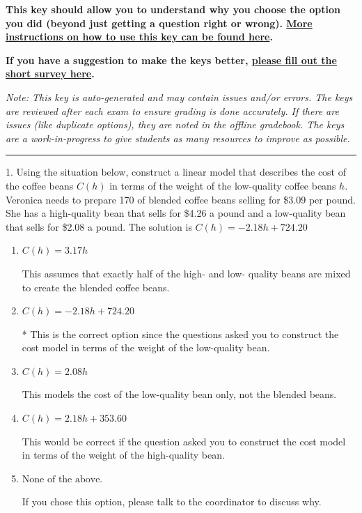 \documentclass{extbook}[14pt]
\begin{document}
\textbf{This key should allow you to understand why you choose the option you did (beyond just getting a question right or wrong). \href{https://xronos.clas.ufl.edu/mac1105spring2020/courseDescriptionAndMisc/Exams/LearningFromResults}{More instructions on how to use this key can be found here}.}

\textbf{If you have a suggestion to make the keys better, \href{https://forms.gle/CZkbZmPbC9XALEE88}{please fill out the short survey here}.}

\textit{Note: This key is auto-generated and may contain issues and/or errors. The keys are reviewed after each exam to ensure grading is done accurately. If there are issues (like duplicate options), they are noted in the offline gradebook. The keys are a work-in-progress to give students as many resources to improve as possible.}

\rule{\textwidth}{0.4pt}

1. Using the situation below, construct a linear model that describes the cost of the coffee beans $C(h)$ in terms of the weight of the low-quality coffee beans $h$.
Veronica needs to prepare 170 of blended coffee beans selling for \$3.09 per pound. She has a high-quality bean that sells for \$4.26 a pound and a low-quality bean that sells for \$2.08 a pound. 
The solution is $ C(h) = -2.18 h + 724.20 $ 

\begin{enumerate}[label=\Alph*.] 
\item $ C(h) = 3.17 h $ 

 This assumes that exactly half of the high- and low- quality beans are mixed to create the blended coffee beans. 
\item $ C(h) = -2.18 h + 724.20 $ 

 * This is the correct option since the questions asked you to construct the cost model in terms of the weight of the low-quality bean. 
\item $ C(h) = 2.08 h $ 

 This models the cost of the low-quality bean only, not the blended beans. 
\item $ C(h) = 2.18 h + 353.60 $ 

 This would be correct if the question asked you to construct the cost model in terms of the weight of the high-quality bean. 
\item $ \text{None of the above.} $ 

 If you chose this option, please talk to the coordinator to discuss why. 
\end{enumerate} 
 
\end{document}
